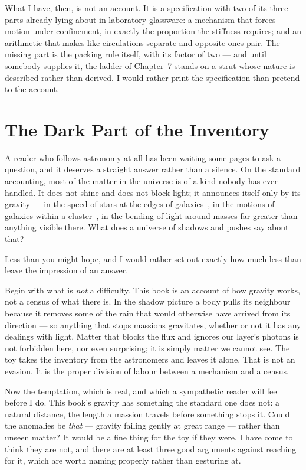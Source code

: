 \documentclass[fontsize=11pt,paper=a4,pagesize=auto,parskip=half-]{scrbook}
\begin{document}
What I have, then, is not an account. It is a specification with two of its three parts already lying about in laboratory glassware: a mechanism that forces motion under confinement, in exactly the proportion the stiffness requires; and an arithmetic that makes like circulations separate and opposite ones pair. The missing part is the packing rule itself, with its factor of two --- and until somebody supplies it, the ladder of Chapter~7 stands on a strut whose nature is described rather than derived. I would rather print the specification than pretend to the account.


\section{The Dark Part of the Inventory}

A reader who follows astronomy at all has been waiting some pages to ask a question, and it deserves a straight answer rather than a silence. On the standard accounting, most of the matter in the universe is of a kind nobody has ever handled. It does not shine and does not block light; it announces itself only by its gravity --- in the speed of stars at the edges of galaxies~\cite{rubin1980}, in the motions of galaxies within a cluster~\cite{zwicky1933}, in the bending of light around masses far greater than anything visible there. What does a universe of shadows and pushes say about that?

Less than you might hope, and I would rather set out exactly how much less than leave the impression of an answer.

Begin with what is \emph{not} a difficulty. This book is an account of how gravity works, not a census of what there is. In the shadow picture a body pulls its neighbour because it removes some of the rain that would otherwise have arrived from its direction --- so anything that stops massions gravitates, whether or not it has any dealings with light. Matter that blocks the flux and ignores our layer's photons is not forbidden here, nor even surprising; it is simply matter we cannot see. The toy takes the inventory from the astronomers and leaves it alone. That is not an evasion. It is the proper division of labour between a mechanism and a census.

Now the temptation, which is real, and which a sympathetic reader will feel before I do. This book's gravity has something the standard one does not: a natural distance, the length a massion travels before something stops it. Could the anomalies be \emph{that} --- gravity failing gently at great range --- rather than unseen matter? It would be a fine thing for the toy if they were. I have come to think they are not, and there are at least three good arguments against reaching for it, which are worth naming properly rather than gesturing at.
\end{document}
